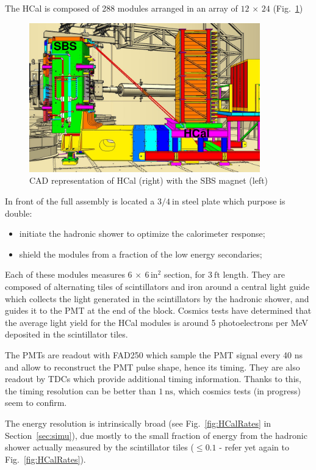 The HCal is composed of 288 modules arranged in an array of $12\, \times \, 24$ (Fig.~\ref{fig:hcal_cad})
%
\begin{figure}[!h]
  \begin{center}
    \includegraphics[width=10cm]{Plots/Wines_SBS_CAD_Fall2018.png}
    \caption{CAD representation of HCal (right) with the SBS magnet (left)}
    \label{fig:hcal_cad}
  \end{center}
\end{figure}
%
In front of the full assembly is located a $3/4~\mathrm{in}$ steel plate which purpose is double:
%
\begin{itemize}
\item{initiate the hadronic shower to optimize the calorimeter response;}
\item{shield the modules from a fraction of the low energy secondaries;}
\end{itemize}
%
Each of these modules measures $6\,\times~6\,\mathrm{in}^2$ section, for $3~\mathrm{ft}$ length. They are composed of alternating tiles of scintillators and iron around a central light guide which collects the light generated in the scintillators by the hadronic shower, and guides it to the PMT at the end of the block.
Cosmics tests have determined that the average light yield for the HCal modules is around 5 photoelectrons per MeV deposited in the scintillator tiles.

The PMTs are readout with FAD250 which sample the PMT signal every 40 ns and allow to reconstruct the PMT pulse shape, hence its timing.
They are also readout by TDCs which provide additional timing information.
Thanks to this, the timing resolution can be better than $1~\mathrm{ns}$, which cosmics tests (in progress) seem to confirm.

The energy resolution is intrinsically broad (see Fig.~\ref{fig:HCalRates} in Section~\ref{sec:simu}), due mostly to the small fraction of energy from the hadronic shower actually measured by the scintillator tiles ($\leq 0.1$ - refer yet again to Fig.~\ref{fig:HCalRates}).

